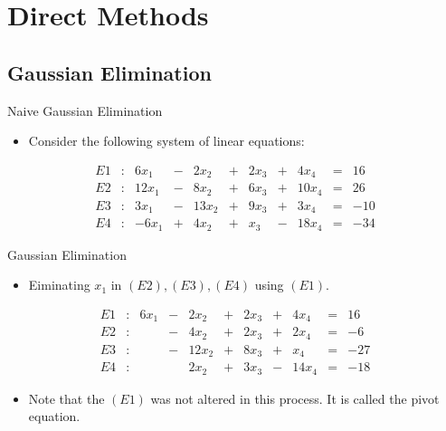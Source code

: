 \documentclass{beamer}
\begin{document}
\section[Direct Methods]{Direct Methods}
\subsection[Gaussian Elimination]{Gaussian Elimination}
\begin{frame}{Naive Gaussian Elimination}
\begin{itemize}
\item Consider the following system of linear equations:
\end{itemize}
\begin{block}{}
\begin{align*}
E1&:&6x_1&-&2x_2&+&2 x_3 &+&4 x_4 &=&16\\
E2&:&12x_1&-&8x_2&+&6x_3&+&10x_4 &=&26\\
E3&:&3x_1&-&13x_2&+&9x_3&+&3x_4 &=&-10\\
E4&:&-6x_1&+&4x_2&+&x_3&-&18x_4 &=&-34 
\end{align*}
\end{block}
\end{frame}
\begin{frame}{Gaussian Elimination}
\begin{itemize}
\item Eiminating $x_1$ in $(E2),(E3),(E4)$ using $(E1)$. 
\end{itemize}
\begin{block}{}
\begin{align*}
E1&:&6x_1&-&2x_2&+&2 x_3 &+&4 x_4 &=&16\\
E2&:&&-&4x_2&+&2x_3&+&2x_4 &=&-6\\
E3&:&&-&12x_2&+&8x_3&+&x_4 &=&-27\\
E4&:&&&2x_2&+&3x_3&-&14x_4 &=&-18 
\end{align*}
\end{block}
\begin{itemize}
\item Note that the $(E1)$ was not altered in this process. It is called the \alert{pivot equation}.
\end{itemize}


\end{frame}
\end{document}

